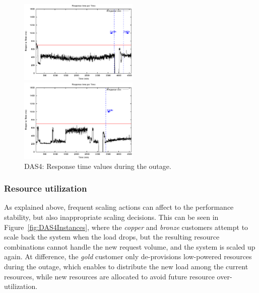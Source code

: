 \begin{figure}[htb]
\begin{minipage}[b]{0.2\linewidth}
		\vspace{-4mm}
	\end{minipage}
\hfill
\begin{minipage}[b]{0.2\linewidth}
		\vspace{-4mm}
		\includegraphics[width=\linewidth,height=4cm]{images/exps2011/medium_up/das/proxyDataPoints_output.eps}
		\vspace{-4mm}
	\end{minipage}
\hfill
\begin{minipage}[b]{0.19\linewidth}
		\vspace{-4mm}
		\includegraphics[width=\linewidth,height=4cm]{images/exps2011/high/das/proxyDataPoints_output.eps}
		\vspace{-4mm}
	\end{minipage}
\caption{DAS4: Response time values during the outage.}
\label{fig:DAS4ResponseTime}
\end{figure}


\subsubsection{Resource utilization}

As explained above, frequent scaling actions can affect to the performance stability, but also inappropriate scaling decisions. This can be seen in Figure~\ref{fig:DAS4Instances}, where the \emph{copper} and \emph{bronze} customers attempt to scale back the system when the load drops, but the resulting resource combinations cannot handle the new request volume, and the system is scaled up again.  At difference, the \emph{gold} customer only de-provisions low-powered resources during the outage, which enables to distribute the new load among the current resources, while new resources are allocated to avoid future resource over-utilization. 

